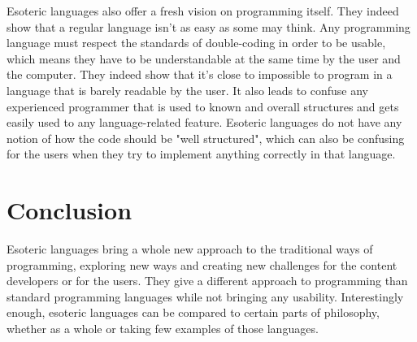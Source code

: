 \documentclass[4paper]{article}
\begin{document}
Esoteric languages also offer a fresh vision on programming itself. They indeed show that a regular language isn't as easy as some may think. Any programming language must respect the standards of double-coding in order to be usable, which means they have to be understandable at the same time by the user and the computer. They indeed show that it's close to impossible to program in a language that is barely readable by the user. It also leads to confuse any experienced programmer that is used to known and overall structures and gets easily used to any language-related feature. Esoteric languages do not have any notion of how the code should be "well structured", which can also be confusing for the users when they try to implement anything correctly in that language. 
\pagebreak
\section{Conclusion}
Esoteric languages bring a whole new approach to the traditional ways of programming, exploring new ways and creating new challenges for the content developers or for the users. They give a different approach to programming than standard programming languages while not bringing any usability. Interestingly enough, esoteric languages can be compared to certain parts of philosophy, whether as a whole or taking few examples of those languages. 
\end{document}

